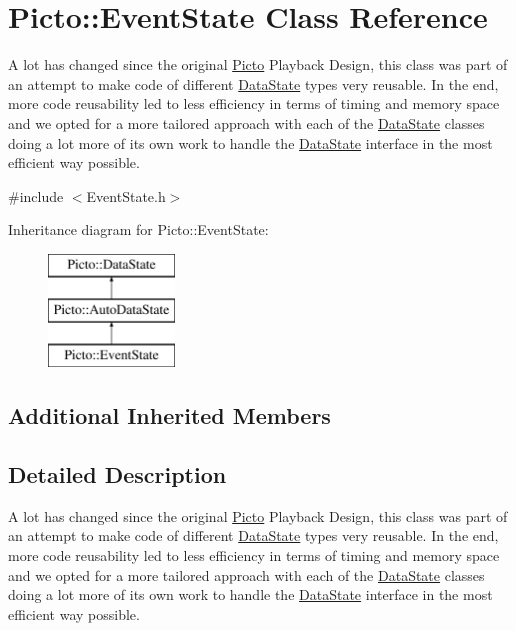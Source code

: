 \hypertarget{class_picto_1_1_event_state}{\section{Picto\-:\-:Event\-State Class Reference}
\label{class_picto_1_1_event_state}
}


A lot has changed since the original \hyperlink{namespace_picto}{Picto} Playback Design, this class was part of an attempt to make code of different \hyperlink{class_picto_1_1_data_state}{Data\-State} types very reusable. In the end, more code reusability led to less efficiency in terms of timing and memory space and we opted for a more tailored approach with each of the \hyperlink{class_picto_1_1_data_state}{Data\-State} classes doing a lot more of its own work to handle the \hyperlink{class_picto_1_1_data_state}{Data\-State} interface in the most efficient way possible.  




{\ttfamily \#include $<$Event\-State.\-h$>$}

Inheritance diagram for Picto\-:\-:Event\-State\-:\begin{figure}[H]
\begin{center}
\leavevmode
\includegraphics[height=3.000000cm]{class_picto_1_1_event_state}
\end{center}
\end{figure}
\subsection*{Additional Inherited Members}


\subsection{Detailed Description}
A lot has changed since the original \hyperlink{namespace_picto}{Picto} Playback Design, this class was part of an attempt to make code of different \hyperlink{class_picto_1_1_data_state}{Data\-State} types very reusable. In the end, more code reusability led to less efficiency in terms of timing and memory space and we opted for a more tailored approach with each of the \hyperlink{class_picto_1_1_data_state}{Data\-State} classes doing a lot more of its own work to handle the \hyperlink{class_picto_1_1_data_state}{Data\-State} interface in the most efficient way possible. 

